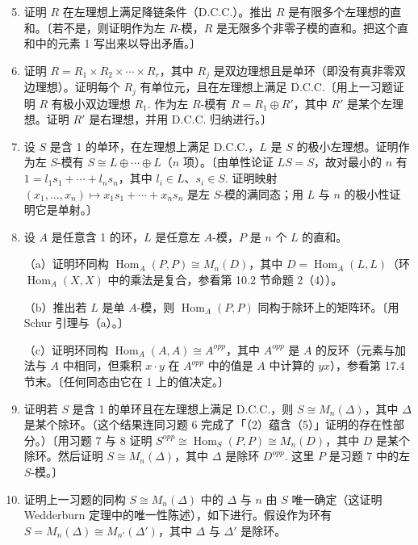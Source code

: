 \begin{enumerate}
\setcounter{enumi}{4}
\item 证明 \(R\) 在左理想上满足降链条件（D.C.C.）。推出 \(R\) 是有限多个左理想的直和。〔若不是，则证明作为左 \(R\)-模，\(R\) 是无限多个非零子模的直和。把这个直和中的元素 1 写出来以导出矛盾。〕

\item 证明 \(R = R_1 \times R_2 \times \cdots \times R_r\)，其中 \(R_j\) 是双边理想且是单环（即没有真非零双边理想）。证明每个 \(R_j\) 有单位元，且在左理想上满足 D.C.C.〔用上一习题证明 \(R\) 有极小双边理想 \(R_1\). 作为左 \(R\)-模有 \(R = R_1 \oplus R'\)，其中 \(R'\) 是某个左理想。证明 \(R'\) 是右理想，并用 D.C.C. 归纳进行。〕

\item 设 \(S\) 是含 1 的单环，在左理想上满足 D.C.C.，\(L\) 是 \(S\) 的极小左理想。证明作为左 \(S\)-模有 \(S \cong L \oplus \cdots \oplus L\)（\(n\) 项）。〔由单性论证 \(LS = S\)，故对最小的 \(n\) 有 \(1 = l_1s_1 + \cdots + l_ns_n\)，其中 \(l_i \in L\)、\(s_i \in S\). 证明映射 \((x_1, \ldots, x_n) \mapsto x_1s_1 + \cdots + x_ns_n\) 是左 \(S\)-模的满同态；用 \(L\) 与 \(n\) 的极小性证明它是单射。〕

\item 设 \(A\) 是任意含 1 的环，\(L\) 是任意左 \(A\)-模，\(P\) 是 \(n\) 个 \(L\) 的直和。

（a）证明环同构 \(\operatorname{Hom}_A(P, P) \cong M_n(D)\)，其中 \(D = \operatorname{Hom}_A(L, L)\)（环 \(\operatorname{Hom}_A(X, X)\) 中的乘法是复合，参看第 10.2 节命题 2（4））。

（b）推出若 \(L\) 是单 \(A\)-模，则 \(\operatorname{Hom}_A(P, P)\) 同构于除环上的矩阵环。〔用 Schur 引理与（a）。〕

（c）证明环同构 \(\operatorname{Hom}_A(A, A) \cong A^{opp}\)，其中 \(A^{opp}\) 是 \(A\) 的反环（元素与加法与 \(A\) 中相同，但乘积 \(x \cdot y\) 在 \(A^{opp}\) 中的值是 \(A\) 中计算的 \(yx\)），参看第 17.4 节末。〔任何同态由它在 1 上的值决定。〕

\item 证明若 \(S\) 是含 1 的单环且在左理想上满足 D.C.C.，则 \(S \cong M_n(\Delta)\)，其中 \(\Delta\) 是某个除环。（这个结果连同习题 6 完成了「（2）蕴含（5）」证明的存在性部分。）〔用习题 7 与 8 证明 \(S^{opp} \cong \operatorname{Hom}_S(P, P) \cong M_n(D)\)，其中 \(D\) 是某个除环。然后证明 \(S \cong M_n(\Delta)\)，其中 \(\Delta\) 是除环 \(D^{opp}\). 这里 \(P\) 是习题 7 中的左 \(S\)-模。〕

\item 证明上一习题的同构 \(S \cong M_n(\Delta)\) 中的 \(\Delta\) 与 \(n\) 由 \(S\) 唯一确定（这证明 Wedderburn 定理中的唯一性陈述），如下进行。假设作为环有 \(S = M_n(\Delta) \cong M_{n'}(\Delta')\)，其中 \(\Delta\) 与 \(\Delta'\) 是除环。


\end{enumerate}
